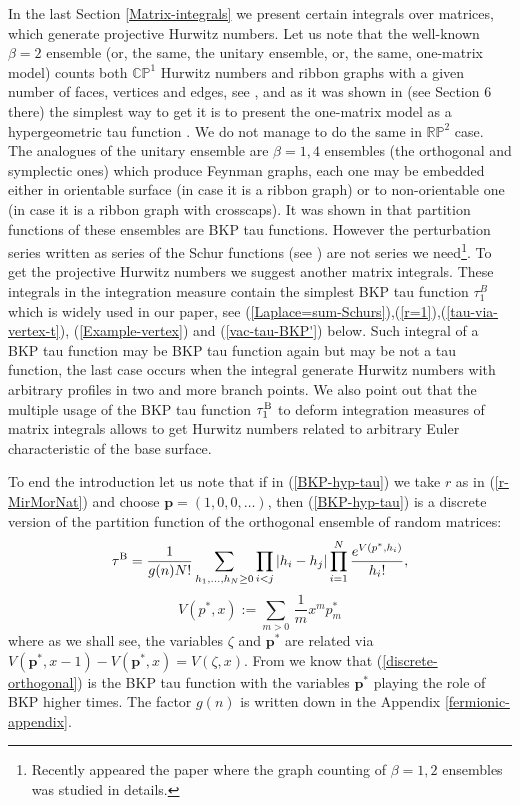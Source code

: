\documentclass[a4paper,10pt]{article}
\newcommand{\bpow}{\mathbf{p}}
\theoremstyle{plain}
\theoremstyle{remark}
\def\be{\begin{equation}}
\def\ee{\end{equation}}
\begin{document}
In the last Section \ref{Matrix-integrals} we present certain integrals over matrices, which generate projective Hurwitz
numbers. Let us note that the well-known $\beta=2$ ensemble (or, the same, the unitary ensemble, or, the same, one-matrix model)
counts both $\mathbb{CP}^1$ Hurwitz numbers and ribbon graphs with a given number of faces, vertices and edges, see
\cite{MelloKochRamgoolam},
and as it was shown in \cite{NO-2014} (see Section 6 there) the simplest way to get it is to present the one-matrix model as a
hypergeometric tau function \cite{HO-2003}. We do not manage to do the same in $\mathbb{RP}^2$ case. The analogues of the
unitary ensemble are $\beta=1,4$ ensembles (the orthogonal and symplectic ones) which produce Feynman graphs, each one may be
embedded either in orientable surface (in case it is a ribbon graph) or to non-orientable one (in case it is a ribbon
graph with crosscaps).
It was shown in \cite{L1} that partition functions of these ensembles are BKP tau functions.
However the perturbation series written as series of the Schur functions (see \cite{OST-I}) are not
series we need\footnote{Recently appeared the paper \cite{Carrel} where the graph counting of $\beta=1,2$ ensembles was
studied in details.}. To get  the projective Hurwitz numbers we suggest another matrix integrals. These integrals
in the integration measure
contain the simplest BKP tau function $\tau^{B}_1$ which is widely used in our paper, see
(\ref{Laplace=sum-Schurs}),(\ref{r=1}),(\ref{tau-via-vertex-t}),
(\ref{Example-vertex}) and (\ref{vac-tau-BKP'}) below.
Such integral of a BKP tau function may be BKP tau function again but may be not a tau function, the last case occurs
when the integral generate Hurwitz numbers with arbitrary profiles in two and more branch points. We also point out
that the multiple usage of the BKP tau function $\tau_1^{\rm B}$ to deform integration measures of matrix integrals allows to get Hurwitz numbers
related to arbitrary Euler characteristic of the base surface.

To end the introduction let us note that if in (\ref{BKP-hyp-tau})  we take $r$ as in (\ref{r-MirMorNat}) and choose
$\bpow=(1,0,0,\dots)$,
then  (\ref{BKP-hyp-tau}) is a discrete version of the partition function
of the orthogonal ensemble of random matrices:
\be\label{discrete-orthogonal}
 \tau^{\rm B} =\frac{1}{g(n)N!} \sum_{h_1,\dots,h_N\ge 0} \prod_{i<j}|h_i-h_j| \prod_{i=1}^{N} \frac{e^{V(p^*,h_i)}}{h_i!},
\ee
\be\label{V}
V(p^*,x):=\sum_{m>0}\,\frac 1m x^m p^*_m
\ee
where as we shall see, the variables $\zeta$ and $\bpow^*$ are related via $V(\bpow^*,x-1)-V(\bpow^*,x)=V(\zeta ,x)$.
From \cite{L1} we know that (\ref{discrete-orthogonal}) is the BKP tau function with the variables $\bpow^*$
playing the role of  BKP higher times. The factor $g(n)$ is written down in the Appendix \ref{fermionic-appendix}.
\end{document}
